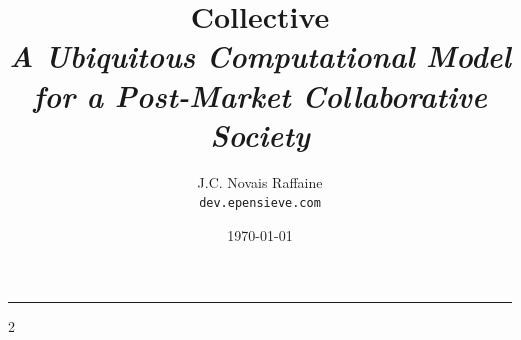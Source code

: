 \documentclass[10pt, a4paper]{article}
\title{
    {\headerfont\Huge \textbf{Collective}} \\
    \vspace{0.5em}
    {\large \textit{A Ubiquitous Computational Model for a Post-Market Collaborative Society}}
}
\author{J.C. Novais Raffaine \\ \small \texttt{dev.epensieve.com}}
\date{\today}
\newcommand{\magazineRule}{
    \nointerlineskip \vspace{0.5em}
    \noindent\rule{\textwidth}{1.2pt}
    \vspace{0.5em}
}
\begin{document}
\maketitle

\begin{abstract}

\end{abstract}

\vspace{2em}
\magazineRule %

\begin{multicols}{2}
















\end{multicols}

\newpage


\newpage

\newpage

\end{document}
